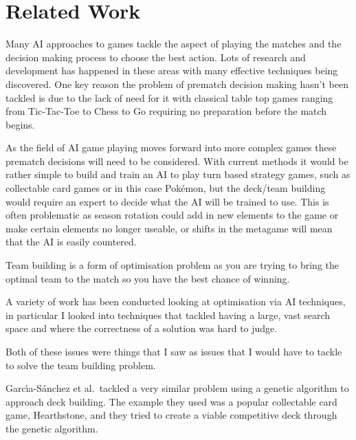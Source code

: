\documentclass[a4paper]{article}
\newcommand{\Pokemon}{Pok\'{e}mon}
\begin{document}
\pagebreak{}

\section{Related Work}

\par
Many AI approaches to games tackle the aspect of playing the matches and the decision making process to choose the best action.
Lots of research and development has happened in these areas with many effective techniques being discovered.
One key reason the problem of prematch decision making hasn't been tackled is due to the lack of need for it with classical table top games ranging from Tic-Tac-Toe to Chess to Go requiring no preparation before the match begins.
\par
As the field of AI game playing moves forward into more complex games these prematch decisions will need to be considered.
With current methods it would be rather simple to build and train an AI to play turn based strategy games, such as collectable card games or in this case \Pokemon{}, but the deck/team building would require an expert to decide what the AI will be trained to use.
This is often problematic as season rotation could add in new elements to the game or make certain elements no longer useable, or shifts in the metagame will mean that the AI is easily countered.
\par
Team building is a form of optimisation problem as you are trying to bring the optimal team to the match so you have the best chance of winning.

A variety of work has been conducted looking at optimisation via AI techniques, in particular I looked into techniques that tackled having a large, vast search space and where the correctness of a solution was hard to judge.

Both of these issues were things that I saw as issues that I would have to tackle to solve the team building problem.
\\ \par
Garc{\'\i}a-S{\'a}nchez et al.\ tackled a very similar problem using a genetic algorithm to approach deck building\cite{hearthstoneAI}.
The example they used was a popular collectable card game, Hearthstone, and they tried to create a viable competitive deck through the genetic algorithm.
\end{document}
